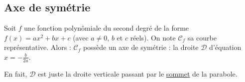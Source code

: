 	\subsection{Axe de symétrie}

	\begin{formula}
		Soit $f$ une fonction polynômiale du second degré de la forme $f(x) = ax^2 + bx +c$ (avec $a \neq 0$, $b$ et $c$ réels). On note $\mathcal{C}_f$ sa courbe représentative. Alors :
		\newpar
		$\mathcal{C}_f$ possède un axe de symétrie : la droite $\mathcal{D}$ d'équation $x = -\frac{b}{2a}$.
	\end{formula}

	\begin{tip}
		En fait, $\mathcal{D}$ est juste la droite verticale passant par le \hyperref[variations]{sommet} de la parabole.
	\end{tip}

